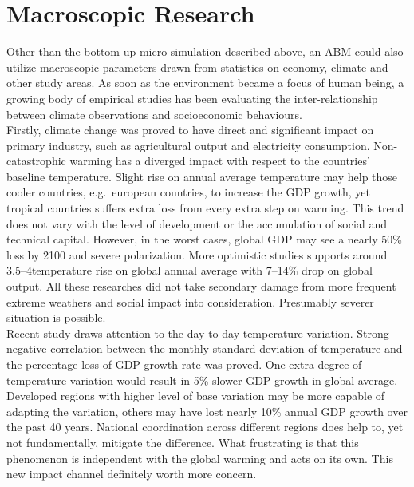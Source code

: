 \documentclass[12pt,twoside]{report}
\begin{document}
	
	
	\section{Macroscopic Research}\label{sec:marco-scopic-climate-and-finance-research}
	Other than the bottom-up micro-simulation described above, an ABM could also utilize macroscopic parameters drawn
	from statistics on economy, climate and other study areas\cite{Castro2020}.
	As soon as the environment became a focus of human being, a growing body of empirical studies has been
	evaluating the inter-relationship between climate observations and socioeconomic behaviours.\\
	
	Firstly, climate change was proved to have direct and significant impact on primary industry, such as
	agricultural output\cite{moore2017new} and electricity consumption\cite{wenz2017north}.
	Non-catastrophic warming has a diverged impact with respect to the countries' baseline
	temperature\cite{burke2015global}.
	Slight rise on annual average temperature may help those cooler countries, e.g.\ european countries, to increase
	the GDP growth,    yet tropical countries suffers extra loss from every extra step on warming.
	This trend does not vary with the level of development or the accumulation of social and technical capital.
	However, in the worst cases, global GDP may see a nearly 50\% loss by 2100 and severe
	polarization\cite{burke2015global}.
	More optimistic studies supports around 3.5--4\textcelsius temperature rise on global annual average with 7--14\%
	drop on global output\cite{howard2017few, kalkuhl2020impact}.
	All these researches did not take secondary damage from more frequent extreme weathers and social impact into
	consideration.
	Presumably severer situation is possible.\\
	\clearpage
	Recent study draws attention to the day-to-day temperature variation\cite{Day2Day}.
	Strong negative correlation between the monthly standard deviation of temperature and the percentage loss of GDP
	growth rate was proved.
	One extra degree of temperature variation would result in 5\% slower GDP growth in global average.
	Developed regions with higher level of base variation may be more capable of adapting the variation, others may
	have lost nearly 10\% annual GDP growth over the past 40 years.
	National coordination across different regions does help to, yet not fundamentally, mitigate the difference.
	What frustrating is that this phenomenon is independent with the global warming and acts on its own.
	This new impact channel definitely worth more concern.
	
\end{document}

